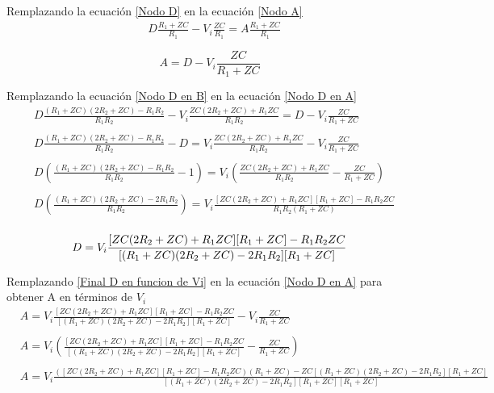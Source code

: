     Remplazando la ecuación \ref{Nodo D} en la ecuación \ref{Nodo A}
    \begin{align*}
        &D\frac{R_{1}+ZC}{R_{1}} - V_{i}\frac{ZC}{R_{1}} = A\frac{R_{1}+ZC}{R_{1}} \\\\
    \end{align*}
    \begin{equation}\label{Nodo D en A}
        A = D - V_{i}\frac{ZC}{R_{1}+ZC}
    \end{equation}
    
    Remplazando la ecuación \ref{Nodo D en B} en la ecuación \ref{Nodo D en A}
    \begin{align*}
        &D\frac{ (R_{1}+ZC)(2R_{2}+ZC) - R_{1}R_{2} }{ R_{1}R_{2}} - V_{i}\frac{ ZC(2R_{2}+ZC)+ R_{1}ZC }{ R_{1}R_{2}} = D - V_{i}\frac{ZC}{R_{1}+ZC} \\\\
        &D\frac{ (R_{1}+ZC)(2R_{2}+ZC) -  R_{1}R_{2} }{ R_{1}R_{2}} - D = V_{i}\frac{ ZC(2R_{2}+ZC)+ R_{1}ZC }{ R_{1}R_{2}} - V_{i}\frac{ZC}{R_{1}+ZC} \\\\
        &D(\frac{ (R_{1}+ZC)(2R_{2}+ZC) -  R_{1}R_{2} }{ R_{1}R_{2} } - 1) = V_{i}(\frac{ ZC(2R_{2}+ZC)+ R_{1}ZC }{ R_{1}R_{2}} - \frac{ZC}{R_{1}+ZC}) \\\\
        &D(\frac{ (R_{1}+ZC)(2R_{2}+ZC) -  2R_{1}R_{2} }{ R_{1}R_{2} }) = V_{i}\frac{ [ZC(2R_{2}+ZC)+ R_{1}ZC][R_{1}+ZC] - R_{1}R_{2}ZC }{ R_{1}R_{2}(R_{1}+ZC)} \\\\
    \end{align*}
    \begin{equation}\label{Final D en funcion de Vi}
        D = V_{i}\frac{ [ZC(2R_{2}+ZC)+ R_{1}ZC][R_{1}+ZC] - R_{1}R_{2}ZC }{ [(R_{1}+ZC)(2R_{2}+ZC) -  2R_{1}R_{2}][R_{1}+ZC]} \\\\
    \end{equation}
    
    Remplazando \ref{Final D en funcion de Vi} en la ecuación \ref{Nodo D en A} para obtener A en términos de $V_{i}$
    \begin{align*}
        &A = V_{i}\frac{ [ZC(2R_{2}+ZC)+ R_{1}ZC][R_{1}+ZC] - R_{1}R_{2}ZC }{ [(R_{1}+ZC)(2R_{2}+ZC) -  2R_{1}R_{2}][R_{1}+ZC]} - V_{i}\frac{ZC}{R_{1}+ZC}\\\\
        &A = V_{i}(\frac{ [ZC(2R_{2}+ZC)+ R_{1}ZC][R_{1}+ZC] - R_{1}R_{2}ZC }{ [(R_{1}+ZC)(2R_{2}+ZC) -  2R_{1}R_{2}][R_{1}+ZC]} - \frac{ZC}{R_{1}+ZC})\\\\
        &A = V_{i}\frac{ ([ZC(2R_{2}+ZC)+ R_{1}ZC][R_{1}+ZC] - R_{1}R_{2}ZC)(R_{1}+ZC) - ZC[(R_{1}+ZC)(2R_{2}+ZC) -  2R_{1}R_{2}][R_{1}+ZC] }{ [(R_{1}+ZC)(2R_{2}+ZC) -  2R_{1}R_{2}][R_{1}+ZC][R_{1}+ZC] }\\\\
    \end{align*}

